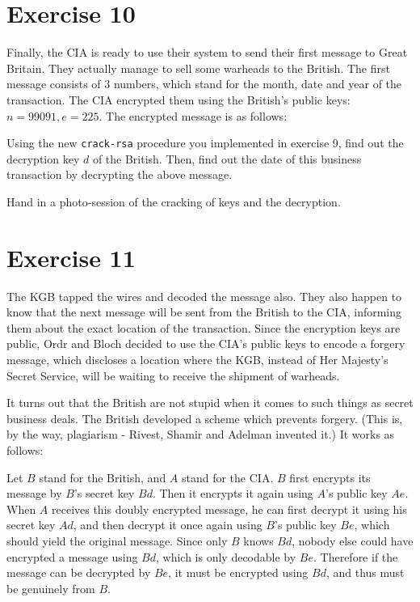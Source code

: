 \section{Exercise 10}

Finally, the CIA is ready to use their system to send their first
message to
Great Britain.  They actually manage to sell some warheads to the British.
The first message consists of 3 numbers, which stand for the month, date and
year of the transaction.  The CIA encrypted them using the British's
public keys: $n = 99091, e = 225$.  The encrypted message is as follows:


Using the new {\tt crack-rsa} procedure you implemented in exercise 9,
find out the decryption key $d$ of the British.  Then, find out
the date of this business transaction by decrypting the above message.

Hand in a photo-session of the cracking of keys and the decryption.

\section{Exercise 11}

The KGB tapped the wires and decoded the message also.  They also happen
to know that the next message will be sent from the British to the CIA,
informing them about the exact location of the transaction.   Since the 
encryption keys are public, Ordr and Bloch decided to use the CIA's
public keys to encode a forgery message, which discloses a location where
the KGB, instead of Her Majesty's Secret Service,  will be waiting to
receive the shipment of warheads.

It turns out that the British are not stupid when it comes to such things
as secret business deals.  The British developed a scheme which prevents
forgery.  (This is, by the way, plagiarism - Rivest, Shamir and Adelman
invented it.)
It works as follows:


Let $B$ stand for the British, and $A$ stand for the CIA.  $B$ first
encrypts its message by $B$'s secret key $Bd$.  Then it encrypts it
again using $A$'s public key $Ae$.  When $A$ receives this doubly encrypted
message, he can first decrypt it using his secret key $Ad$, and then
decrypt it once
again using $B$'s public key $Be$, which should yield the original message.
Since only $B$ knows $Bd$, nobody else could have encrypted a message
using $Bd$, which is only decodable by $Be$.  Therefore if the message
can be decrypted by $Be$, it must be encrypted using $Bd$, and thus must
be genuinely from $B$.

